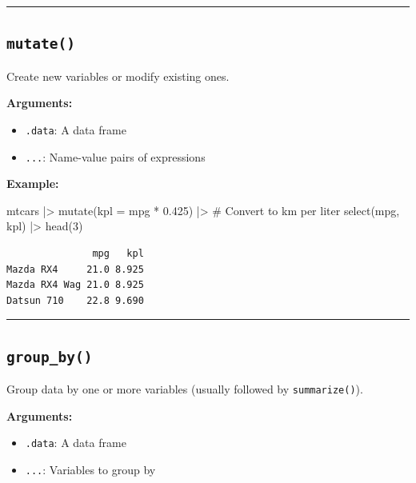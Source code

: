 \documentclass[
  letterpaper,
  DIV=11,
  numbers=noendperiod]{scrreprt}
\newenvironment{Shaded}{\begin{snugshade}}{\end{snugshade}}
\newcommand{\AttributeTok}[1]{\textcolor[rgb]{0.40,0.45,0.13}{#1}}
\newcommand{\CommentTok}[1]{\textcolor[rgb]{0.37,0.37,0.37}{#1}}
\newcommand{\DecValTok}[1]{\textcolor[rgb]{0.68,0.00,0.00}{#1}}
\newcommand{\FloatTok}[1]{\textcolor[rgb]{0.68,0.00,0.00}{#1}}
\newcommand{\FunctionTok}[1]{\textcolor[rgb]{0.28,0.35,0.67}{#1}}
\newcommand{\NormalTok}[1]{\textcolor[rgb]{0.00,0.23,0.31}{#1}}
\newcommand{\SpecialCharTok}[1]{\textcolor[rgb]{0.37,0.37,0.37}{#1}}
\providecommand{\tightlist}{%
  \setlength{\itemsep}{0pt}\setlength{\parskip}{0pt}}
\begin{document}
\begin{center}\rule{0.5\linewidth}{0.5pt}\end{center}

\subsection{\texorpdfstring{\texttt{mutate()}}{mutate()}}\label{mutate}

Create new variables or modify existing ones.

\textbf{Arguments:}

\begin{itemize}
\tightlist
\item
  \texttt{.data}: A data frame
\item
  \texttt{...}: Name-value pairs of expressions
\end{itemize}

\textbf{Example:}

\begin{Shaded}
\begin{Highlighting}[]
\NormalTok{mtcars }\SpecialCharTok{|\textgreater{}}
  \FunctionTok{mutate}\NormalTok{(}\AttributeTok{kpl =}\NormalTok{ mpg }\SpecialCharTok{*} \FloatTok{0.425}\NormalTok{) }\SpecialCharTok{|\textgreater{}}  \CommentTok{\# Convert to km per liter}
  \FunctionTok{select}\NormalTok{(mpg, kpl) }\SpecialCharTok{|\textgreater{}}
  \FunctionTok{head}\NormalTok{(}\DecValTok{3}\NormalTok{)}
\end{Highlighting}
\end{Shaded}

\begin{verbatim}
               mpg   kpl
Mazda RX4     21.0 8.925
Mazda RX4 Wag 21.0 8.925
Datsun 710    22.8 9.690
\end{verbatim}

\begin{center}\rule{0.5\linewidth}{0.5pt}\end{center}

\subsection{\texorpdfstring{\texttt{group\_by()}}{group\_by()}}\label{group_by}

Group data by one or more variables (usually followed by
\texttt{summarize()}).

\textbf{Arguments:}

\begin{itemize}
\tightlist
\item
  \texttt{.data}: A data frame
\item
  \texttt{...}: Variables to group by
\end{itemize}
\end{document}
